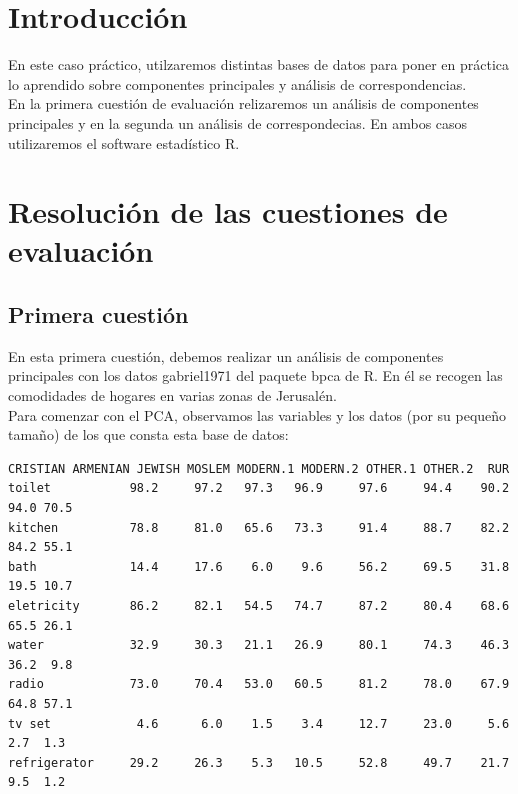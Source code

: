 \documentclass[12pt,a4paper,twoside,openright,titlepage,final]{article}
\author{José Ignacio Escribano}
\title{}
\begin{document}
\setcounter{page}{1}


\listoffigures
\thispagestyle{empty}
\newpage

\listoftables
\thispagestyle{empty}
\newpage

\tableofcontents
\thispagestyle{empty}
\newpage


\setcounter{page}{1}

\section{Introducción}

En este caso práctico, utilzaremos distintas bases de datos para poner en práctica lo aprendido sobre componentes principales y análisis de correspondencias.\\

En la primera cuestión de evaluación relizaremos un análisis de componentes principales y en la segunda un análisis de correspondecias. En ambos casos utilizaremos el software estadístico R.

\section{Resolución de las cuestiones de evaluación}

\subsection{Primera cuestión}

En esta primera cuestión, debemos realizar un análisis de componentes principales con los datos gabriel1971 del paquete bpca de R. En él se recogen las comodidades de hogares en varias zonas de Jerusalén.\\

Para comenzar con el PCA, observamos las variables y los datos (por su pequeño tamaño) de los que consta esta base de datos:

\begin{Verbatim}[fontsize=\scriptsize]
             CRISTIAN ARMENIAN JEWISH MOSLEM MODERN.1 MODERN.2 OTHER.1 OTHER.2  RUR
toilet           98.2     97.2   97.3   96.9     97.6     94.4    90.2    94.0 70.5
kitchen          78.8     81.0   65.6   73.3     91.4     88.7    82.2    84.2 55.1
bath             14.4     17.6    6.0    9.6     56.2     69.5    31.8    19.5 10.7
eletricity       86.2     82.1   54.5   74.7     87.2     80.4    68.6    65.5 26.1
water            32.9     30.3   21.1   26.9     80.1     74.3    46.3    36.2  9.8
radio            73.0     70.4   53.0   60.5     81.2     78.0    67.9    64.8 57.1
tv set            4.6      6.0    1.5    3.4     12.7     23.0     5.6     2.7  1.3
refrigerator     29.2     26.3    5.3   10.5     52.8     49.7    21.7     9.5  1.2
\end{Verbatim}
\end{document}
